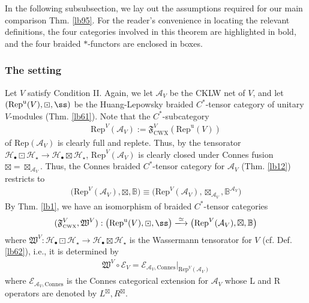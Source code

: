 \documentclass[11pt,b5paper,notitlepage]{article}
\theoremstyle{definition}
\theoremstyle{plain}
\newcommand{\fk}{\mathfrak}
\newcommand{\mc}{\mathcal}
\newcommand{\Rep}{\mathrm{Rep}}
\newcommand{\uni}{\mathrm{u}}
\newcommand{\scr}{\mathscr}
\newcommand{\RepV}{{\mathrm{Rep}^\uni(V)}}
\newcommand{\mbb}{\mathbb}
\newcommand{\blt}{\bullet}
\newcommand{\FVCWX}{{\mathfrak F^V_{\scriptscriptstyle \mathrm{CWX}}}}
\newcommand{\Connes}{\mathrm{Connes}}
\numberwithin{equation}{section}
\begin{document}


In the following subsubsection, we lay out the assumptions required for our main comparison Thm. \ref{lb95}. For the reader’s convenience in locating the relevant definitions, the four categories involved in this theorem are highlighted in bold, and the four braided $*$-functors are enclosed in boxes.

\subsubsection{The setting}\label{lb93}



\begin{comment}
and let 
\begin{align*}
\FVCWX:\RepV\rightarrow\Rep(\mc A_V)
\end{align*}
be the CWX functor.
\end{comment}

Let $V$ satisfy Condition II. Again, we let $\mc A_V$ be the CKLW net of $V$, and let $(\RepV,\boxdot,\ss)$ be the Huang-Lepowsky braided $C^*$-tensor category of unitary $V$-modules (Thm. \ref{lb61}). Note that the $C^*$-subcategory
\begin{align}
\Rep^V(\mc A_V):=\FVCWX(\RepV)
\end{align}
of $\Rep(\mc A_V)$ is clearly full and replete. Thus, by the tensorator $\mc H_\blt\boxdot\mc H_\star\rightarrow\mc H_\blt\boxtimes\mc H_\star$, $\Rep^V(\mc A_V)$ is clearly closed under Connes fusion $\boxtimes=\boxtimes_{\mc A_V}$. Thus, the Connes braided $C^*$-tensor category for $\mc A_V$ (Thm. \ref{lb12}) restricts to
\begin{align*}
\big(\Rep^V(\mc A_V),\boxtimes,\mbb B \big)\equiv\big(\Rep^V(\mc A_V),\boxtimes_{\mc A_V},\mbb B^{\mc A_V}\big)
\end{align*}
By Thm. \ref{lb1}, we have an isomorphism of braided $C^*$-tensor categories
\begin{align}\label{eq72}
(\FVCWX,\fk W^V):\big(\RepV,\boxdot,\ss\big)\xlongrightarrow{\simeq}\big(\Rep^V(\mc A_V),\boxtimes,\mbb B \big)
\end{align}
where $\fk W^V:\mc H_\blt\boxdot\mc H_\star\rightarrow\mc H_\blt\boxtimes\mc H_\star$ is the Wassermann tensorator for $V$ (cf. Def. \ref{lb62}), i.e., it is determined by
\begin{align}\label{eq76}
\fk W^V\circ\scr E_V=\scr E_{\mc A_V,\Connes}\big|_{\Rep^V(\mc A_V)}
\end{align}
where $\scr E_{\mc A_V,\Connes}$ is the Connes categorical extension for $\mc A_V$ whose L and R operators are denoted by $L^\boxtimes,R^\boxtimes$.
\end{document}
